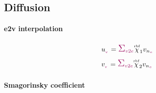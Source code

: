 \clearpage
\subsection{Diffusion}
\label{sub:diffusion}

\paragraph{e2v interpolation}

\begin{align}
    & \windu{}{\v}{} = \sum_{\offProv{v2e}} \Wrbf_1 \vn{}{\e}{} \\
    & \windv{}{\v}{} = \sum_{\offProv{v2e}} \Wrbf_2 \vn{}{\e}{}
\end{align}


\paragraph{Smagorinsky coefficient}

%

